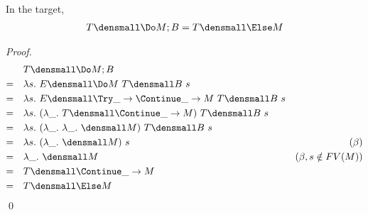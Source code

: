 \begin{lemma}
  \label{thm:template-commit}
  In the target,
  \begin{align*}
    T\den{\Do M; B} = T\den{\Else M}
  \end{align*}
\end{lemma}
\begin{proof}
  \begin{align*}
    &\quad
    T\den{\Do M; B}
    \\
    =& \quad
    \lambda s. ~ E\den{\Do M} ~T\den{B} ~s
    \\
    =& \quad
    \lambda s. ~ E\den{\Try \_ \to \Continue \_ \to M} ~T\den{B} ~s
    \\
    =& \quad
    \lambda s. ~ (\lambda \_. ~T\den{\Continue \_ \to M}) ~T\den{B} ~s
    \\
    =& \quad
    \lambda s. ~ (\lambda \_. ~\lambda \_. ~  \den{M}) ~T\den{B} ~s
    \\
    =& \quad
    \lambda s. ~ (\lambda \_. ~  \den{M}) ~s
    & (\beta)
    \\
    =& \quad
    \lambda \_. ~ \den{M}
    & (\beta, s \notin FV(M))
    \\
    =& \quad
    T\den{\Continue \_ \to M}
    \\
    =& \quad
    T\den{\Else M}
  \end{align*}
  \qed
\end{proof}

